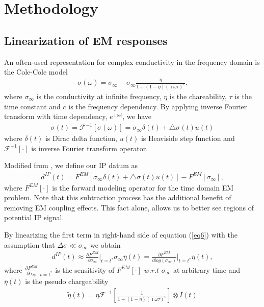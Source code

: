 \documentclass{segabs}
\begin{document}

\section*{Methodology}
\subsection*{Linearization of EM responses}
An often-used representation for complex conductivity in the frequency domain is the Cole-Cole model \cite[]{COLE}
\begin{eqnarray}
  \sigma(\omega) = \sigma_{\infty} - \sigma_{\infty}\frac{\eta}{1+(1-\eta)(\imath\omega\tau)^c}.
\end{eqnarray}
where $\sigma_{\infty}$ is the conductivity at infinite frequency, $\eta$ is the chareability, $\tau$ is the time constant and $c$ is the frequency dependency. By applying inverse Fourier transform with time dependency, $e^{\imath\omega t}$, we have
\begin{eqnarray}
  \sigma(t) = \mathscr{F}^{-1}[\sigma(\omega)] = \sigma_{\infty}\delta(t) + \triangle\sigma(t)u(t)
\end{eqnarray}
where $\delta(t)$ is Dirac delta function, $u(t)$ is Heaviside step function and $\mathscr{F}^{-1}[\cdot]$ is inverse Fourier transform operator.

Modified from \cite{routh2001}, we define our IP datum as
\begin{eqnarray}
  d^{IP}(t)  = F^{EM}[\sigma_{\infty}\delta(t)+\triangle\sigma(t)u(t)] - F^{EM}[\sigma_{\infty}],
  \label{eq6}
\end{eqnarray}
where $F^{EM}[\cdot]$ is the forward modeling operator for the time domain EM problem. Note that this subtraction process has the additional benefit of removing EM coupling effects. This fact alone, allows us to better see regions of potential IP signal.

By linearizing the first term in right-hand side of equation (\ref{eq6}) with the assumption that $\Delta \sigma \ll \sigma_{\infty}$ we obtain
\begin{eqnarray}
  d^{IP}(t)  \approx \frac{\partial F^{EM}}{\partial \sigma_{\infty}}\Big|_{t = t^{*}}\sigma_{\infty}\bar{\eta}(t)
  =  \frac{\partial F^{EM}}{\partial log(\sigma_{\infty})}\Big|_{t = t^{*}}\bar{\eta}(t),
  \label{eq7}
\end{eqnarray}
where $\frac{\partial F^{EM}}{\partial \sigma_{\infty}}\Big|_{t = t^{*}}$ is the sensitivity of $F^{EM}[\cdot]$ $w.r.t$ $\sigma_{\infty}$ at arbitrary time and $\bar{\eta}(t)$ is the pseudo chargeability
\begin{eqnarray}
  \tilde{\eta}(t) = \eta\mathscr{F}^{-1}[\frac{1}{1+(1-\eta)(\imath\omega\tau)^c}]\otimes I(t)
\end{eqnarray}
\end{document}
